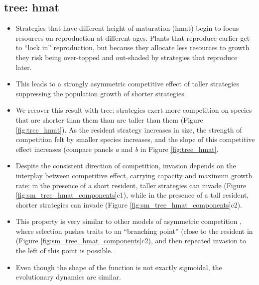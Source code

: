 \documentclass[a4paper,11pt]{article}
\newcommand{\TREE}{{\sc tree}}
\begin{document}
\subsection{\TREE: hmat}

\begin{itemize}
\item Strategies that have different height of maturation (hmat) begin
  to focus resources on reproduction at different ages.  Plants that
  reproduce earlier get to ``lock in'' reproduction, but because they
  allocate less resources to growth they risk being over-topped and
  out-shaded by strategies that reproduce later.
\item This leads to a strongly asymmetric competitive effect of taller
  strategies suppressing the population growth of shorter strategies.
\item We recover this result with \TREE: strategies exert more
  competition on species that are shorter than them than are taller
  than them (Figure \ref{fig:tree_hmat}).  As the resident strategy
  increases in size, the strength of competition felt by smaller
  species increases, and the slope of this competitive effect
  increases (compare panels \textit{a} and \textit{b} in Figure
  \ref{fig:tree_hmat}.
\item Despite the consistent direction of competition, invasion
  depends on the interplay between competitive effect, carrying
  capacity and maximum growth rate; in the presence of a short
  resident, taller strategies can invade (Figure
  \ref{fig:sm_tree_hmat_components}c1), while in the presence of a
  tall resident, shorter strategies can invade (Figure
  \ref{fig:sm_tree_hmat_components}c2).
\item This property is very similar to other models of asymmetric
  competition \citep[e.g.,][]{Kisdi-1999}, where selection pushes
  traits to an ``branching point'' (close to the resident in (Figure
  \ref{fig:sm_tree_hmat_components}c2), and then repeated invasion to
  the left of this point is possible.
\item Even though the shape of the function is not exactly sigmoidal,
  the evolutionary dynamics are similar.
\end{itemize}
\end{document}
